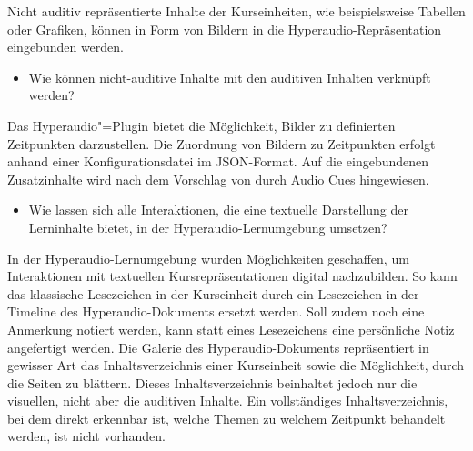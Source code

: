 Nicht auditiv repräsentierte Inhalte der Kurseinheiten, wie beispielsweise Tabellen oder Grafiken, können in Form von Bildern in die Hyperaudio-Repräsentation eingebunden werden.

\begin{itemize}
\item Wie können nicht-auditive Inhalte mit den auditiven Inhalten verknüpft werden?
\end{itemize}

Das Hyperaudio"=Plugin bietet die Möglichkeit, Bilder zu definierten Zeitpunkten darzustellen. Die Zuordnung von Bildern zu Zeitpunkten erfolgt anhand einer Konfigurationsdatei im JSON-Format. Auf die eingebundenen Zusatzinhalte wird nach dem Vorschlag von \cite{donker2007gestaltung} durch Audio Cues hingewiesen. 

\begin{itemize}
\item Wie lassen sich alle Interaktionen, die eine textuelle Darstellung der Lerninhalte bietet, in der Hyperaudio-Lernumgebung umsetzen?
\end{itemize}

In der Hyperaudio-Lernumgebung wurden Möglichkeiten geschaffen, um Interaktionen mit textuellen Kursrepräsentationen digital nachzubilden. So kann das klassische Lesezeichen in der Kurseinheit durch ein Lesezeichen in der Timeline des Hyperaudio-Dokuments ersetzt werden. Soll zudem noch eine Anmerkung notiert werden, kann statt eines Lesezeichens eine persönliche Notiz angefertigt werden. Die Galerie des Hyperaudio-Dokuments repräsentiert in gewisser Art das Inhaltsverzeichnis einer Kurseinheit sowie die Möglichkeit, durch die Seiten zu blättern. Dieses \glqq Inhaltsverzeichnis\grqq{} beinhaltet jedoch nur die visuellen, nicht aber die auditiven Inhalte. Ein vollständiges Inhaltsverzeichnis, bei dem direkt erkennbar ist, welche Themen zu welchem Zeitpunkt behandelt werden, ist nicht vorhanden.

